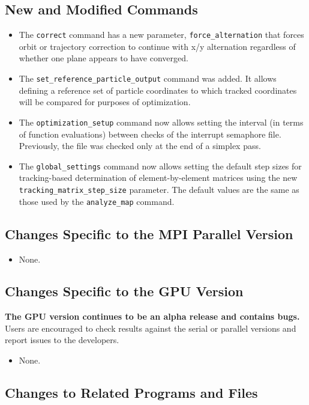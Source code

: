 \documentclass[11pt]{article}
\begin{document}
\subsection{New and Modified Commands}
\begin{itemize}
\item The \verb|correct| command has a new parameter, \verb|force_alternation| that forces orbit or trajectory correction
  to continue with x/y alternation regardless of whether one plane appears to have converged.
\item The \verb|set_reference_particle_output| command was added. It allows defining a reference set of particle coordinates
  to which tracked coordinates will be compared for purposes of optimization.
\item The \verb|optimization_setup| command now allows setting the interval (in terms of function evaluations) 
  between checks of the interrupt semaphore file. Previously, the file was checked only at the end of a simplex pass.
\item The \verb|global_settings| command now allows setting the default step sizes for tracking-based determination
  of element-by-element matrices using the new \verb|tracking_matrix_step_size| parameter. The default values are
  the same as those used by the \verb|analyze_map| command.
\end{itemize}

\subsection{Changes Specific to the MPI Parallel Version}

\begin{itemize}
\item None.
\end{itemize}

\subsection{Changes Specific to the GPU Version}

{\bf The GPU version continues to be an alpha release and contains bugs.}
Users are encouraged to check results against the serial or parallel versions and report issues to the developers.

\begin{itemize}
\item None.
\end{itemize}

\subsection{Changes to Related Programs and Files}
\end{document}
